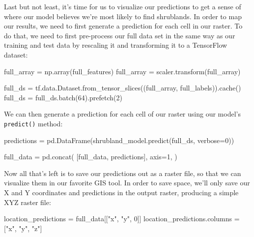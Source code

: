 \documentclass[
  letterpaper,
  DIV=11,
  numbers=noendperiod]{scrartcl}
\newenvironment{Shaded}{\begin{snugshade}}{\end{snugshade}}
\newcommand{\DecValTok}[1]{\textcolor[rgb]{0.68,0.00,0.00}{#1}}
\newcommand{\NormalTok}[1]{\textcolor[rgb]{0.00,0.23,0.31}{#1}}
\newcommand{\OperatorTok}[1]{\textcolor[rgb]{0.37,0.37,0.37}{#1}}
\newcommand{\StringTok}[1]{\textcolor[rgb]{0.13,0.47,0.30}{#1}}
\begin{document}
Last but not least, it's time for us to visualize our predictions to get
a sense of where our model believes we're most likely to find
shrublands. In order to map our results, we need to first generate a
prediction for each cell in our raster. To do that, we need to first
pre-process our full data set in the same way as our training and test
data by rescaling it and transforming it to a TensorFlow dataset:

\begin{Shaded}
\begin{Highlighting}[]
\NormalTok{full\_array }\OperatorTok{=}\NormalTok{ np.array(full\_features)}
\NormalTok{full\_array }\OperatorTok{=}\NormalTok{ scaler.transform(full\_array)}

\NormalTok{full\_ds }\OperatorTok{=}\NormalTok{ tf.data.Dataset.from\_tensor\_slices((full\_array, full\_labels)).cache()}
\NormalTok{full\_ds }\OperatorTok{=}\NormalTok{ full\_ds.batch(}\DecValTok{64}\NormalTok{).prefetch(}\DecValTok{2}\NormalTok{)}
\end{Highlighting}
\end{Shaded}

We can then generate a prediction for each cell of our raster using our
model's \texttt{predict()} method:

\begin{Shaded}
\begin{Highlighting}[]
\NormalTok{predictions }\OperatorTok{=}\NormalTok{ pd.DataFrame(shrubland\_model.predict(full\_ds, verbose}\OperatorTok{=}\DecValTok{0}\NormalTok{))}

\NormalTok{full\_data }\OperatorTok{=}\NormalTok{ pd.concat(}
\NormalTok{    [full\_data, predictions],}
\NormalTok{    axis}\OperatorTok{=}\DecValTok{1}\NormalTok{,}
\NormalTok{)}
\end{Highlighting}
\end{Shaded}

Now all that's left is to save our predictions out as a raster file, so
that we can visualize them in our favorite GIS tool. In order to save
space, we'll only save our X and Y coordinates and predictions in the
output raster, producing a simple XYZ raster file:

\begin{Shaded}
\begin{Highlighting}[]
\NormalTok{location\_predictions }\OperatorTok{=}\NormalTok{ full\_data[[}\StringTok{"x"}\NormalTok{, }\StringTok{"y"}\NormalTok{, }\DecValTok{0}\NormalTok{]]}
\NormalTok{location\_predictions.columns }\OperatorTok{=}\NormalTok{ [}\StringTok{"x"}\NormalTok{, }\StringTok{"y"}\NormalTok{, }\StringTok{"z"}\NormalTok{]}
\end{Highlighting}
\end{Shaded}
\end{document}
